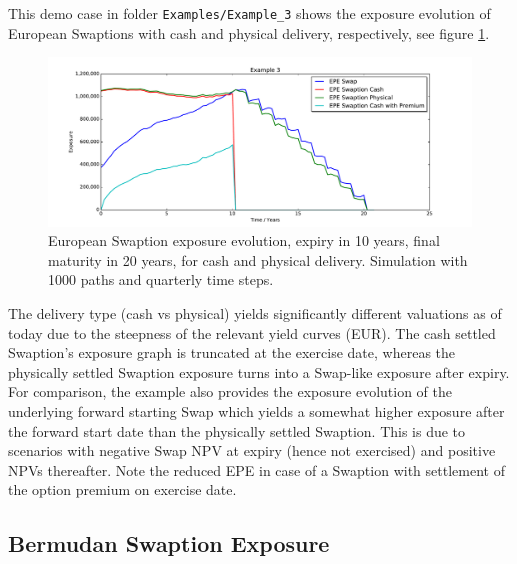 \documentclass[12pt, a4paper]{article}
\begin{document}
This demo case in folder {\tt Examples/Example\_3} shows the exposure evolution of European Swaptions with cash and
physical delivery, respectively, see figure \ref{fig_3}.
\begin{figure}[h!]
\begin{center}
\includegraphics[scale=0.45]{mpl_swaption.pdf}
\end{center}
\caption{European Swaption exposure evolution, expiry in 10 years, final maturity in 20 years, for cash and physical
  delivery. Simulation with 1000 paths and quarterly time steps. }
\label{fig_3}
\end{figure}
The delivery type (cash vs physical) yields significantly different valuations as of today due to the steepness of the
relevant yield curves (EUR). The cash settled Swaption's exposure graph is truncated at the exercise date, whereas the
physically settled Swaption exposure turns into a Swap-like exposure after expiry. For comparison, the example also
provides the exposure evolution of the underlying forward starting Swap which yields a somewhat higher exposure after
the forward start date than the physically settled Swaption. This is due to scenarios with negative Swap NPV at expiry
(hence not exercised) and positive NPVs thereafter. Note the reduced EPE in case of a Swaption with settlement of the option premium on exercise date.

\subsection{Bermudan Swaption Exposure}
\end{document}

